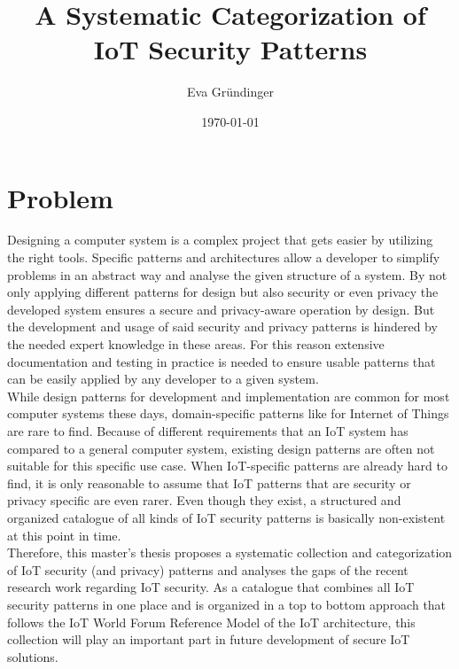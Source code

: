 \documentclass[
    numbers=noenddot,
    parskip=half-,
    fontsize=12pt,
    paper=a4,
    oneside,
    titlepage,
    bibliography=totoc,
    chapterprefix=false,
]{scrbook}
\title{A Systematic Categorization of \\ IoT Security Patterns}
\author{Eva Gründinger}
\date{\today}
\begin{document}

    \frontmatter
    
    \tableofcontents
    \newpage


    \mainmatter

    \chapter{Problem}\label{ch:problem}
    
    Designing a computer system is a complex project that gets easier by utilizing the right tools. Specific patterns and architectures allow a developer to simplify problems in an abstract way and analyse the given structure of a system. By not only applying different patterns for design but also security or even privacy the developed system ensures a secure and privacy-aware operation by design. But the development and usage of said security and privacy patterns is hindered by the needed expert knowledge in these areas. For this reason extensive documentation and testing in practice is needed to ensure usable patterns that can be easily applied by any developer to a given system. \\
    While design patterns for development and implementation are common for most computer systems these days, domain-specific patterns like for Internet of Things are rare to find. Because of different requirements that an IoT system has compared to a general computer system, existing design patterns are often not suitable for this specific use case. When IoT-specific patterns are already hard to find, it is only reasonable to assume that IoT patterns that are security or privacy specific are even rarer. Even though they exist, a structured and organized catalogue of all kinds of IoT security patterns is basically non-existent at this point in time. \\
    Therefore, this master's thesis proposes a systematic collection and categorization of IoT security (and privacy) patterns and analyses the gaps of the recent research work regarding IoT security. As a catalogue that combines all IoT security patterns in one place and is organized in a top to bottom approach that follows the IoT World Forum Reference Model of the IoT architecture, this collection will play an important part in future development of secure IoT solutions. 
        
\end{document}
